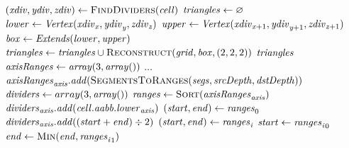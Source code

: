\begin{algorithm}
	\centering
	\begin{algorithmic}[1]
			\State $(\var{xdiv}, \var{ydiv}, \var{zdiv}) \gets \Call{FindDividers}{\var{cell}}$
			\State $\mathit{triangles} \gets \varnothing$
				\State $\mathit{lower} \gets \mathit{Vertex}(\mathit{xdiv}_{\mathit{x}    }, \mathit{ydiv}_{\mathit{y}    }, \mathit{zdiv}_{\mathit{z}    })$
				\State $\mathit{upper} \gets \mathit{Vertex}(\mathit{xdiv}_{\mathit{x} + 1}, \mathit{ydiv}_{\mathit{y} + 1}, \mathit{zdiv}_{\mathit{z} + 1})$
				\State $\mathit{box} \gets \mathit{Extends}(\mathit{lower}, \mathit{upper})$
				\State $\var{triangles} \gets \var{triangles} \cup \Call{Reconstruct}{\var{grid}, \var{box}, (2, 2, 2)}$
			\EndFor
			\State \Return $\mathit{triangles}$
		\EndFunction
		\\
			\State $\mathit{axisRanges} \gets \mathit{array}(3, \mathit{array}())$
				\State $\dots$ 
					\State $\var{axisRanges}_{\var{axis}}.\var{add}(\Call{SegmentsToRanges}{\var{segs}, \var{srcDepth}, \var{dstDepth}})$
				\EndIf
			\EndFor
			\State $\mathit{dividers} \gets array(3, \mathit{array}())$
				\State $\var{ranges} \gets \Call{Sort}{\var{axisRanges}_{\var{axis}}}$ 
				\State $\mathit{dividers}_{\mathit{axis}}.\mathit{add}(\mathit{cell}.\mathit{aabb}.\mathit{lower}_{\mathit{axis}})$
				\State $(\mathit{start}, \mathit{end}) \gets \mathit{ranges}_0$
						\State $\mathit{dividers}_{\mathit{axis}}.\mathit{add}((\mathit{start} + \mathit{end}) \div 2)$
						\State $(\mathit{start}, \mathit{end}) \gets \mathit{ranges}_{\mathit{i}}$
					\Else
						\State $\mathit{start} \gets {\ensuremath{\mathit{ranges}}_{\ensuremath{\mathit{i}}}}_0$
						\State $\var{end} \gets \Call{Min}{\var{end}, {\var{ranges}_{\var{i}}}_1}$

\end{algorithmic}
\end{algorithm}
